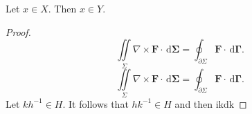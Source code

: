 \documentclass[11pt, letterpaper]{report}
\begin{document}
\begin{theorem}
	Let $x\in X$. Then $x\in Y$.
\end{theorem}
\begin{proof}
	\[
		\iint\limits_{\Sigma } \nabla \times \mathbf{F}\cdot  \,\mathrm{d} \boldsymbol{\Sigma} =\oint_{\partial \Sigma } \mathbf{F}\cdot  \,\mathrm{d} \boldsymbol{\Gamma} 
	.\]
	\[
		\iint\limits_{\Sigma } \nabla \times \mathbf{F}\cdot  \,\mathrm{d} \boldsymbol{\Sigma} =\oint_{\partial \Sigma } \mathbf{F}\cdot  \,\mathrm{d} \boldsymbol{\Gamma} 
	.\]
	Let $kh^{-1}\in H$. It follows that $hk^{-1}\in H$ and then ikdk
	
\end{proof}
\end{document}
